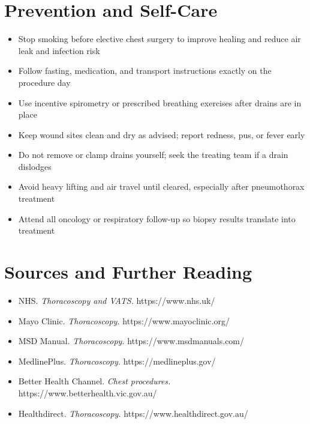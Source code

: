 \section*{Prevention and Self-Care}
\begin{itemize}
    \item Stop smoking before elective chest surgery to improve healing and reduce air leak and infection risk
    \item Follow fasting, medication, and transport instructions exactly on the procedure day
    \item Use incentive spirometry or prescribed breathing exercises after drains are in place
    \item Keep wound sites clean and dry as advised; report redness, pus, or fever early
    \item Do not remove or clamp drains yourself; seek the treating team if a drain dislodges
    \item Avoid heavy lifting and air travel until cleared, especially after pneumothorax treatment
    \item Attend all oncology or respiratory follow-up so biopsy results translate into treatment
\end{itemize}

\section*{Sources and Further Reading}
\begin{itemize}
    \item NHS. \textit{Thoracoscopy and VATS.} https://www.nhs.uk/
    \item Mayo Clinic. \textit{Thoracoscopy.} https://www.mayoclinic.org/
    \item MSD Manual. \textit{Thoracoscopy.} https://www.msdmanuals.com/
    \item MedlinePlus. \textit{Thoracoscopy.} https://medlineplus.gov/
    \item Better Health Channel. \textit{Chest procedures.} https://www.betterhealth.vic.gov.au/
    \item Healthdirect. \textit{Thoracoscopy.} https://www.healthdirect.gov.au/
\end{itemize}
